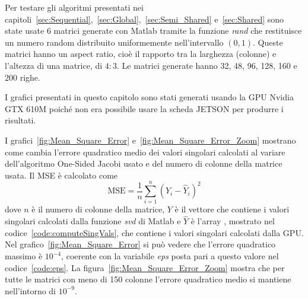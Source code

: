 Per testare gli algoritmi presentati nei capitoli~\ref{sec:Sequential},~\ref{sec:Global},~\ref{sec:Semi_Shared} e~\ref{sec:Shared} sono state usate 6 matrici generate con Matlab tramite la funzione \textit{rand} che restituisce un numero random distribuito uniformemente nell'intervallo $(0,1)$. Queste matrici hanno un aspect ratio, cioè il rapporto tra la larghezza (colonne) e l'altezza di una matrice, di $4:3$. Le matrici generate hanno 32, 48, 96, 128, 160 e 200 righe. 

I grafici presentati in questo capitolo sono stati generati usando la GPU Nvidia GTX 610M poiché non era possibile usare la scheda JETSON per produrre i risultati.

I grafici~\ref{fig:Mean_Square_Error} e~\ref{fig:Mean_Square_Error_Zoom} mostrano come cambia l'errore quadratico medio dei valori singolari calcolati al variare dell'algoritmo One-Sided Jacobi usato e del numero di colonne della matrice usata. Il MSE è calcolato come 
$$ \text{MSE} = \dfrac{1}{n} \sum_{i = 1}^{n} (Y_i - \hat{Y}_i)^2$$
dove $n$ è il numero di colonne della matrice, $Y$ è il vettore che contiene i valori singolari calcolati dalla funzione \textit{svd} di Matlab e $\hat{Y}$ è l'array , mostrato nel codice~\ref{code:computeSingVals}, che contiene i valori singolari calcolati dalla GPU. Nel grafico~\ref{fig:Mean_Square_Error} si può vedere che l'errore quadratico massimo è $10^{-4}$, coerente con la variabile \textit{eps} posta pari a questo valore nel codice~\ref{code:eps}. La figura~\ref{fig:Mean_Square_Error_Zoom} mostra che per tutte le matrici con meno di 150 colonne l'errore quadratico medio si mantiene nell'intorno di $10^{-9}$.
